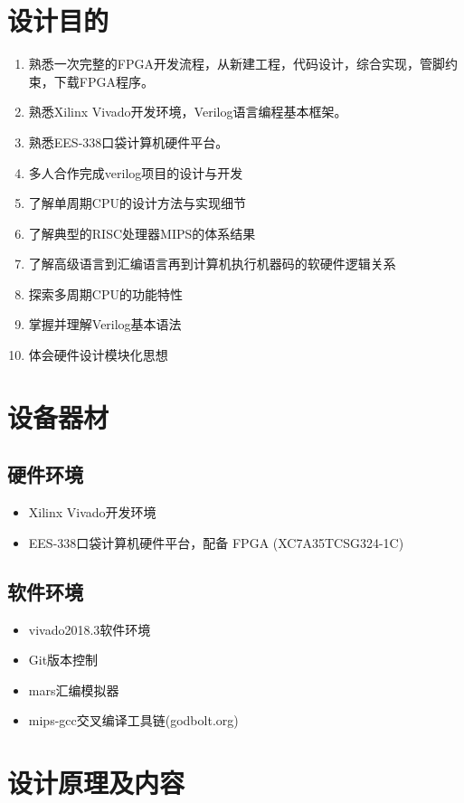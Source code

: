 \documentclass[UTF8]{article}
\begin{document}
\section{设计目的}
\begin{enumerate}
\item 熟悉一次完整的FPGA开发流程，从新建工程，代码设计，综合实现，管脚约束，下载FPGA程序。
\item 熟悉Xilinx Vivado开发环境，Verilog语言编程基本框架。
\item 熟悉EES-338口袋计算机硬件平台。
\item 多人合作完成verilog项目的设计与开发
\item 了解单周期CPU的设计方法与实现细节
\item 了解典型的RISC处理器MIPS的体系结果
\item 了解高级语言到汇编语言再到计算机执行机器码的软硬件逻辑关系
\item 探索多周期CPU的功能特性
\item 掌握并理解Verilog基本语法
\item 体会硬件设计模块化思想
\end{enumerate}

\section{设备器材}

\subsection{硬件环境}

\begin{itemize}
\item Xilinx Vivado开发环境
\item EES-338口袋计算机硬件平台，配备 FPGA (XC7A35TCSG324-1C)
\end{itemize}

\subsection{软件环境}
\begin{itemize}
\item vivado2018.3软件环境
\item Git版本控制
\item mars汇编模拟器
\item mips-gcc交叉编译工具链(godbolt.org)
\end{itemize}

\section{设计原理及内容}
\end{document}
